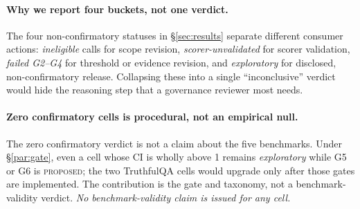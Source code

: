 \paragraph{Why we report four buckets, not one verdict.} The four
non-confirmatory statuses in \S\ref{sec:results} separate different
consumer actions: \emph{ineligible} calls for scope revision,
\emph{scorer-unvalidated} for scorer validation, \emph{failed
G2--G4} for threshold or evidence revision, and \emph{exploratory}
for disclosed, non-confirmatory release. Collapsing these into a
single ``inconclusive'' verdict would hide the reasoning step that a
governance reviewer most needs.

\paragraph{Zero confirmatory cells is procedural, not an empirical
null.} The zero confirmatory verdict is not a claim about the five
benchmarks. Under \S\ref{par:gate}, even a cell whose CI is wholly
above 1 remains \emph{exploratory} while G5 or G6 is
\textsc{proposed}; the two TruthfulQA cells would upgrade only after
those gates are implemented. The contribution is the gate and
taxonomy, not a benchmark-validity verdict. \emph{No
benchmark-validity claim is issued for any cell.}
